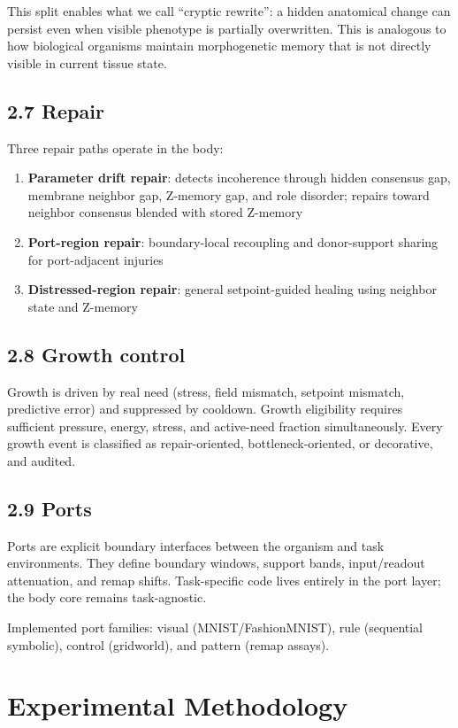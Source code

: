 \documentclass[11pt,a4paper]{article}
\begin{document}
This split enables what we call ``cryptic rewrite'': a hidden anatomical change can persist even when visible phenotype is partially overwritten. This is analogous to how biological organisms maintain morphogenetic memory that is not directly visible in current tissue state.

\subsection{2.7 Repair}
Three repair paths operate in the body:
\begin{enumerate}[leftmargin=*,itemsep=3pt]
\item \textbf{Parameter drift repair}: detects incoherence through hidden consensus gap, membrane neighbor gap, Z-memory gap, and role disorder; repairs toward neighbor consensus blended with stored Z-memory
\item \textbf{Port-region repair}: boundary-local recoupling and donor-support sharing for port-adjacent injuries
\item \textbf{Distressed-region repair}: general setpoint-guided healing using neighbor state and Z-memory
\end{enumerate}

\subsection{2.8 Growth control}
Growth is driven by real need (stress, field mismatch, setpoint mismatch, predictive error) and suppressed by cooldown. Growth eligibility requires sufficient pressure, energy, stress, and active-need fraction simultaneously. Every growth event is classified as repair-oriented, bottleneck-oriented, or decorative, and audited.

\subsection{2.9 Ports}
Ports are explicit boundary interfaces between the organism and task environments. They define boundary windows, support bands, input/readout attenuation, and remap shifts. Task-specific code lives entirely in the port layer; the body core remains task-agnostic.

Implemented port families: visual (MNIST/FashionMNIST), rule (sequential symbolic), control (gridworld), and pattern (remap assays).

\section{Experimental Methodology}
\end{document}
